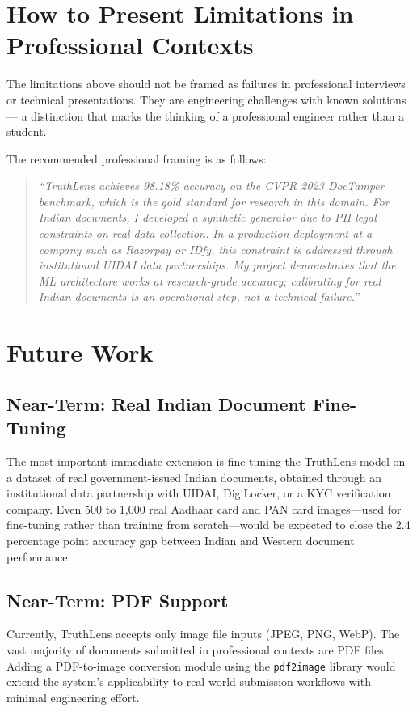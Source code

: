 \documentclass[12pt,a4paper,oneside]{report}
\begin{document}
\section{How to Present Limitations in Professional Contexts}

The limitations above should not be framed as failures in professional interviews
or technical presentations. They are engineering challenges with known solutions---
a distinction that marks the thinking of a professional engineer rather than a
student.

The recommended professional framing is as follows:

\begin{quote}
\textit{``TruthLens achieves 98.18\% accuracy on the CVPR 2023 DocTamper benchmark,
which is the gold standard for research in this domain. For Indian documents, I
developed a synthetic generator due to PII legal constraints on real data collection.
In a production deployment at a company such as Razorpay or IDfy, this constraint
is addressed through institutional UIDAI data partnerships. My project demonstrates
that the ML architecture works at research-grade accuracy; calibrating for real
Indian documents is an operational step, not a technical failure.''}
\end{quote}

\section{Future Work}

\subsection{Near-Term: Real Indian Document Fine-Tuning}

The most important immediate extension is fine-tuning the TruthLens model on a
dataset of real government-issued Indian documents, obtained through an
institutional data partnership with UIDAI, DigiLocker, or a KYC verification
company. Even 500 to 1,000 real Aadhaar card and PAN card images---used for
fine-tuning rather than training from scratch---would be expected to close the
2.4 percentage point accuracy gap between Indian and Western document performance.

\subsection{Near-Term: PDF Support}

Currently, TruthLens accepts only image file inputs (JPEG, PNG, WebP). The vast
majority of documents submitted in professional contexts are PDF files. Adding a
PDF-to-image conversion module using the \texttt{pdf2image} library would extend
the system's applicability to real-world submission workflows with minimal
engineering effort.
\end{document}
